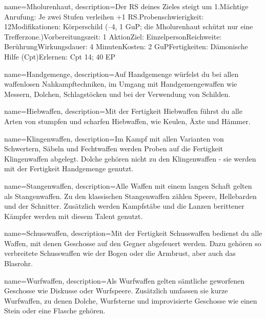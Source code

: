 {
    name={Mholurenhaut},
    description={Der RS deines Zieles steigt um 1.\newline Mächtige Anrufung: Je zwei Stufen verleihen +1 RS.\newline Probenschwierigkeit: 12\newline Modifikationen: Körperschild (–4, 1 GuP; die Mholurenhaut schützt nur eine Trefferzone.)\newline Vorbereitungszeit: 1 Aktion\newline Ziel: Einzelperson\newline Reichweite: Berührung\newline Wirkungsdauer: 4 Minuten\newline Kosten: 2 GuP\newline Fertigkeiten: Dämonische Hilfe (Cpt)\newline Erlernen: Cpt 14; 40 EP}
}


{
    name={Handgemenge},
    description={Auf Handgemenge würfelst du bei allen waffenlosen Nahkampftechniken, im Umgang mit Handgemengewaffen wie Messern, Dolchen, Schlagstöcken und bei der Verwendung von Schilden.}
}


{
    name={Hiebwaffen},
    description={Mit der Fertigkeit Hiebwaffen führst du alle Arten von stumpfen und scharfen Hiebwaffen, wie Keulen, Äxte und Hämmer. }
}


{
    name={Klingenwaffen},
    description={Im Kampf mit allen Varianten von Schwertern, Säbeln und Fechtwaffen werden Proben auf die Fertigkeit Klingenwaffen abgelegt. Dolche gehören nicht zu den Klingenwaffen - sie werden mit der Fertigkeit Handgemenge genutzt.}
}


{
    name={Stangenwaffen},
    description={Alle Waffen mit einem langen Schaft gelten als Stangenwaffen. Zu den klassischen Stangenwaffen zählen Speere, Hellebarden und der Schnitter. Zusätzlich werden Kampfstäbe und die Lanzen berittener Kämpfer werden mit diesem Talent genutzt.}
}


{
    name={Schusswaffen},
    description={Mit der Fertigkeit Schusswaffen bedienst du alle Waffen, mit denen Geschosse auf den Gegner abgefeuert werden. Dazu gehören so verbreitete Schusswaffen wie der Bogen oder die Armbrust, aber auch das Blasrohr.}
}


{
    name={Wurfwaffen},
    description={Als Wurfwaffen gelten sämtliche geworfenen Geschosse wie Diskusse oder Wurfspeere. Zusätzlich umfassen sie kurze Wurfwaffen, zu denen Dolche, Wurfsterne und improvisierte Geschosse wie einen Stein oder eine Flasche gehören.}
}


